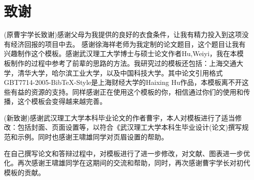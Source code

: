 \section*{致谢}
(原曹宇学长致谢)感谢父母为我提供的良好的衣食条件，让我有精力投入到这项没有经济回报的项目中去。
感谢徐海祥老师为我定制的论文题目，这个题目让我有兴趣制作这个模板。感谢武汉理工大学博士与硕士论文作者Hu,Weiyi，我在本模板制作的过程中参考了前辈的思路的方法。我研究过的模板还包括：上海交通大学，清华大学，哈尔滨工业大学，以及中国科技大学。其中论文引用格式GBT7714-2005-BibTeX-Style是上海财经大学的Haixing Hu作品，本模板离不开这些有益的资源的支持。同样感谢正在使用这个模板的你，相信通过你们的使用和传播，这个模板会变得越来越完善。


(新致谢)感谢武汉理工大学本科毕业论文的作者曹宇，本人对模板进行了适当修改：包括封面、页面设置等，以符合《武汉理工大学本科生毕业设计(论文)撰写规范和示例。同时也感谢王啸雄同学对页眉设置的帮助。

在自己撰写论文和答辩过程中，对模板进行了进一步修改，对文献、图表进一步优化。再次感谢王啸雄同学在这期间的交流和帮助，同时，再次感谢曹宇学长对初代模板的贡献。